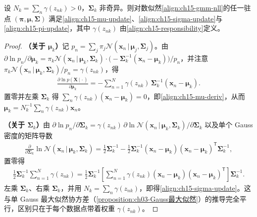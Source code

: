 \documentclass[../../main.tex]{subfiles}
\begin{document}
\begin{proposition}\label{proposition:ch15-GMM最大似然}
设 $N_k=\sum_n\gamma(z_{nk})>0$，$\bm{\Sigma}_k$ 非奇异。则对数似然\eqref{align:ch15-gmm-nll}的任一驻点 $(\bm{\pi},\bm{\mu},\bm{\Sigma})$ 满足\eqref{align:ch15-mu-update}、\eqref{align:ch15-sigma-update}与\eqref{align:ch15-pi-update}，其中 $\gamma(z_{nk})$ 由\eqref{align:ch15-responsibility}定义。
\end{proposition}
\begin{proof}
\textbf{（关于 $\bm{\mu}_k$）}记 $p_n=\sum_j\pi_j\mathcal{N}(\bm{x}_n\,|\,\bm{\mu}_j,\bm{\Sigma}_j)$。由 $\partial\ln p_n/\partial\bm{\mu}_k=\pi_k\mathcal{N}(\bm{x}_n\,|\,\bm{\mu}_k,\bm{\Sigma}_k)\cdot\big(-\bm{\Sigma}_k^{-1}(\bm{x}_n-\bm{\mu}_k)\big)/p_n$，并注意 $\pi_k\mathcal{N}(\bm{x}_n\,|\,\bm{\mu}_k,\bm{\Sigma}_k)/p_n=\gamma(z_{nk})$，得
\begin{align*}
\frac{\partial\ln p(\bm{X}\,|\,\cdot)}{\partial\bm{\mu}_k}
=-\sum_{n=1}^{N}\gamma(z_{nk})\,\bm{\Sigma}_k^{-1}(\bm{x}_n-\bm{\mu}_k).
\end{align*}
置零并左乘 $\bm{\Sigma}_k$ 得 $\sum_n\gamma(z_{nk})(\bm{x}_n-\bm{\mu}_k)=0$，即\eqref{align:ch15-mu-deriv}，从而 $\bm{\mu}_k=N_k^{-1}\sum_n\gamma(z_{nk})\bm{x}_n$。

\textbf{（关于 $\bm{\Sigma}_k$）}由 $\partial\ln p_n/\partial\bm{\Sigma}_k=\gamma(z_{nk})\,\partial\ln\mathcal{N}(\bm{x}_n\,|\,\bm{\mu}_k,\bm{\Sigma}_k)/\partial\bm{\Sigma}_k$ 以及单个 Gauss 密度的矩阵导数
\begin{align*}
\frac{\partial}{\partial\bm{\Sigma}_k}\ln\mathcal{N}(\bm{x}_n\,|\,\bm{\mu}_k,\bm{\Sigma}_k)
=\frac{1}{2}\bm{\Sigma}_k^{-1}-\frac{1}{2}\bm{\Sigma}_k^{-1}(\bm{x}_n-\bm{\mu}_k)(\bm{x}_n-\bm{\mu}_k)^{\mathsf T}\bm{\Sigma}_k^{-1},
\end{align*}
置零得
\begin{align*}
\frac{1}{2}\bm{\Sigma}_k^{-1}\sum_{n=1}^{N}\gamma(z_{nk})
=\frac{1}{2}\bm{\Sigma}_k^{-1}\left[\sum_{n=1}^{N}\gamma(z_{nk})(\bm{x}_n-\bm{\mu}_k)(\bm{x}_n-\bm{\mu}_k)^{\mathsf T}\right]\bm{\Sigma}_k^{-1}.
\end{align*}
左乘 $\bm{\Sigma}_k$、右乘 $\bm{\Sigma}_k$，并用 $N_k=\sum_n\gamma(z_{nk})$，即得\eqref{align:ch15-sigma-update}。这与单 Gauss 最大似然协方差（\cref{proposition:ch03-Gauss最大似然}）的推导完全平行，区别只在于每个数据点带着权重 $\gamma(z_{nk})$。


\end{proof}
\end{document}
